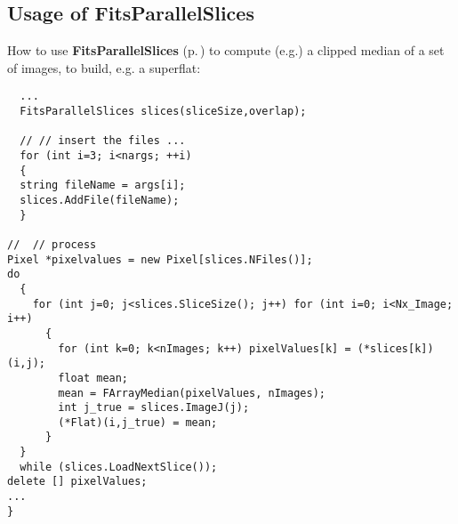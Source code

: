 \subsection{Usage of Fits\-Parallel\-Slices}\label{example_slices}
 How to use {\bf Fits\-Parallel\-Slices} {\rm (p.\,\pageref{class_fitsparallelslices})} to compute (e.g.) a clipped median of a set of images, to build, e.g. a superflat:

\footnotesize\begin{verbatim}  ...
  FitsParallelSlices slices(sliceSize,overlap);
  
  // // insert the files ...
  for (int i=3; i<nargs; ++i)
  {
  string fileName = args[i];
  slices.AddFile(fileName);
  }
  
//  // process 
Pixel *pixelvalues = new Pixel[slices.NFiles()];
do
  {
    for (int j=0; j<slices.SliceSize(); j++) for (int i=0; i<Nx_Image; i++) 
      {
        for (int k=0; k<nImages; k++) pixelValues[k] = (*slices[k])(i,j);
        float mean;
        mean = FArrayMedian(pixelValues, nImages);
        int j_true = slices.ImageJ(j);
        (*Flat)(i,j_true) = mean;
      }
  }  
  while (slices.LoadNextSlice());
delete [] pixelValues;
...
}\end{verbatim}\normalsize 


